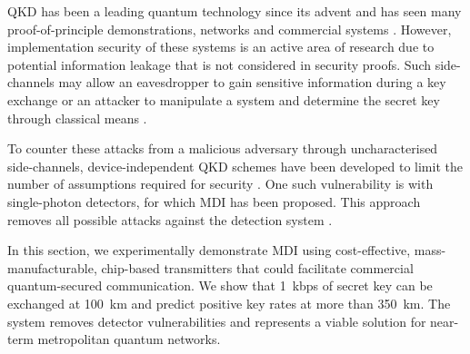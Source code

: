 \Acl{QKD} has been a leading quantum technology since its advent \cite{BB84, E91} and has seen many proof-of-principle demonstrations, networks and commercial systems \cite{yin2016, Rubenok2013, Comandar2016, zhang2018, commercial}. However, implementation security of these systems is an active area of research due to potential information leakage that is not considered in security proofs. Such side-channels may allow an eavesdropper to gain sensitive information during a key exchange \cite{Lo2014} or an attacker to manipulate a system and determine the secret key through classical means \cite{Lydersen2010b}. 

To counter these attacks from a malicious adversary through uncharacterised side-channels, device-independent \ac{QKD} schemes have been developed to limit the number of assumptions required for security \cite{Masanes2011}. One such vulnerability is with single-photon detectors, for which \ac{MDI} has been proposed. This approach removes all possible attacks against the detection system \cite{mdi-qkd}.

In this section, we experimentally demonstrate \ac{MDI} using cost-effective, mass-manufacturable, chip-based transmitters that could facilitate commercial quantum-secured communication. We show that \SI{1}{kbps} of secret key can be exchanged at  \SI{100}{km} and predict positive key rates at more than \SI{350}{km}. The system removes detector vulnerabilities and represents a viable solution for near-term metropolitan quantum networks.




